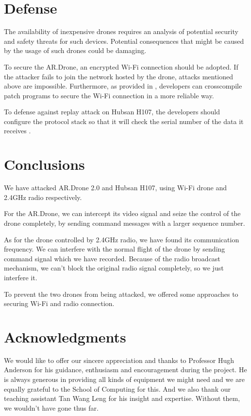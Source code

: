\documentclass{acm_proc_article-sp}
\newcommand{\upcite}[1]{\textsuperscript{\textsuperscript{\cite{#1}}}}
\begin{document}
\section{Defense}

The availability of inexpensive drones requires an analysis of potential security and safety threats for such devices. Potential consequences that might be caused by the usage of such drones could be damaging.

To secure the AR.Drone, an encrypted Wi-Fi connection should be adopted. If the attacker fails to join the network hosted by the drone, attacks mentioned above are impossible. Furthermore, as provided in \cite{hack:secure}, developers can crosscompile patch programs to secure the Wi-Fi connection in a more reliable way.

To defense against replay attack on Hubsan H107, the developers should configure the protocol stack so that it will check the serial number of the data it receives \upcite{radio:defense}. 

\section{Conclusions}

We have attacked AR.Drone 2.0 and Hubsan H107, using Wi-Fi drone and 2.4GHz radio respectively. 

For the AR.Drone, we can intercept its video signal and seize the control of the drone completely, by sending command messages with a larger sequence number. 

As for the drone controlled by 2.4GHz radio, we have found its communication frequency. We can interfere with the normal flight of the drone by sending command signal which we have recorded. Because of the radio broadcast mechanism, we can't block the original radio signal completely, so we just interfere it.

To prevent the two drones from being attacked, we offered some approaches to securing Wi-Fi and radio connection.


\section{Acknowledgments}

We would like to offer our sincere appreciation and thanks to Professor Hugh Anderson for his guidance, enthusiasm and encouragement during the project. He is always generous in providing all kinds of equipment we might need and we are equally grateful to the School of Computing for this. And we also thank our teaching assistant Tan Wang Leng for his insight and expertise. Without them, we wouldn't have gone thus far.
\end{document}
